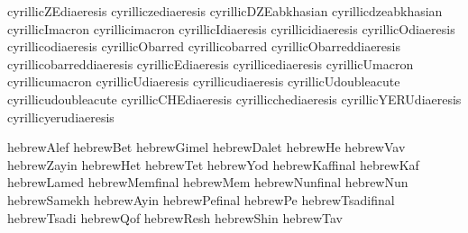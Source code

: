  cyrillicZEdiaeresis        {}
 cyrilliczediaeresis        {}
 cyrillicDZEabkhasian       {}
 cyrillicdzeabkhasian       {}
 cyrillicImacron            {}
 cyrillicimacron            {}
 cyrillicIdiaeresis         {}
 cyrillicidiaeresis         {}
 cyrillicOdiaeresis         {}
 cyrillicodiaeresis         {}
 cyrillicObarred            {}
 cyrillicobarred            {}
 cyrillicObarreddiaeresis   {}
 cyrillicobarreddiaeresis   {}
 cyrillicEdiaeresis         {}
 cyrillicediaeresis         {}
 cyrillicUmacron            {}
 cyrillicumacron            {}
 cyrillicUdiaeresis         {}
 cyrillicudiaeresis         {}
 cyrillicUdoubleacute       {}
 cyrillicudoubleacute       {}
 cyrillicCHEdiaeresis       {}
 cyrillicchediaeresis       {}
 cyrillicYERUdiaeresis      {}
 cyrillicyerudiaeresis      {}

\stopencoding


\startencoding[uc]

 hebrewAlef       {} %
 hebrewBet        {}
 hebrewGimel      {}
 hebrewDalet      {}
 hebrewHe         {}
 hebrewVav        {}
 hebrewZayin      {}
 hebrewHet        {}
 hebrewTet        {}
 hebrewYod        {}
 hebrewKaffinal   {}
 hebrewKaf        {}
 hebrewLamed      {}
 hebrewMemfinal   {}
 hebrewMem        {}
 hebrewNunfinal   {}
 hebrewNun        {}
 hebrewSamekh     {}
 hebrewAyin       {}
 hebrewPefinal    {}
 hebrewPe         {}
 hebrewTsadifinal {}
 hebrewTsadi      {}
 hebrewQof        {}
 hebrewResh       {}
 hebrewShin       {}
 hebrewTav        {} %

\stopencoding

\endinput
